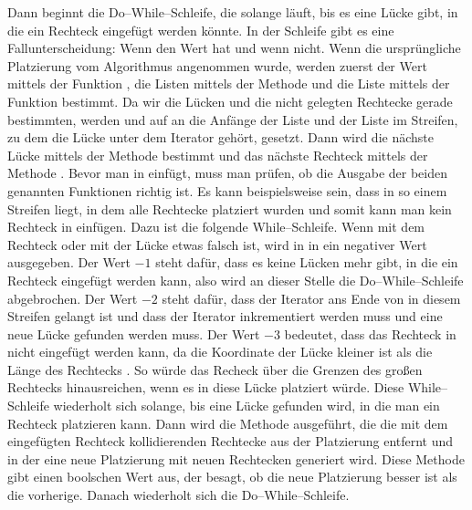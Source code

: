 Dann beginnt die Do--While--Schleife, die solange läuft, bis es eine Lücke gibt,
in die ein Rechteck eingefügt werden könnte.
In der Schleife gibt es eine Fallunterscheidung: Wenn  den Wert  hat und wenn
nicht.
Wenn die ursprüngliche Platzierung vom Algorithmus angenommen wurde,
werden zuerst der Wert  mittels der Funktion , 
die Listen  mittels der Methode  und
die Liste  mittels der Funktion  bestimmt.
Da wir die Lücken und die nicht gelegten Rechtecke gerade bestimmten, 
werden  und  auf an die Anfänge der Liste
 und der Liste  im Streifen, zu
dem die Lücke unter dem Iterator  gehört, gesetzt.
Dann wird die nächste Lücke  mittels der Methode  
bestimmt und das nächste Rechteck  mittels der Methode .
Bevor man  in  einfügt, muss man prüfen,
ob die Ausgabe der beiden genannten Funktionen richtig ist. 
Es kann beispielsweise sein, dass  in so einem Streifen liegt, in dem alle Rechtecke 
platziert wurden und somit kann man kein Rechteck in  einfügen.
Dazu ist die folgende While--Schleife.
Wenn mit dem Rechteck oder mit der Lücke etwas falsch ist, wird in  
in  ein negativer Wert ausgegeben. Der Wert $-1$ steht dafür, 
dass es keine Lücken mehr gibt, in die ein Rechteck eingefügt werden kann, also
wird an dieser Stelle die Do--While--Schleife abgebrochen.
Der Wert $-2$ steht dafür, dass der Iterator ans Ende von  in diesem
Streifen gelangt ist und dass der Iterator  inkrementiert werden muss und eine 
neue Lücke gefunden werden muss.
Der Wert $-3$ bedeutet, dass das Rechteck in  nicht eingefügt werden kann, 
da die Koordinate  der Lücke kleiner ist als die Länge des Rechtecks .
So würde das Recheck über die Grenzen des großen Rechtecks hinausreichen, wenn
es in diese Lücke platziert würde.
Diese While--Schleife wiederholt sich solange, bis eine Lücke gefunden wird,
in die man ein Rechteck platzieren kann. 
Dann wird die Methode  ausgeführt, die 
die mit dem eingefügten Rechteck kollidierenden Rechtecke aus der Platzierung entfernt und 
in der eine neue Platzierung mit neuen Rechtecken generiert wird. 
Diese Methode gibt einen boolschen Wert aus, der besagt, ob die neue Platzierung besser
ist als die vorherige. Danach wiederholt sich die Do--While--Schleife.

